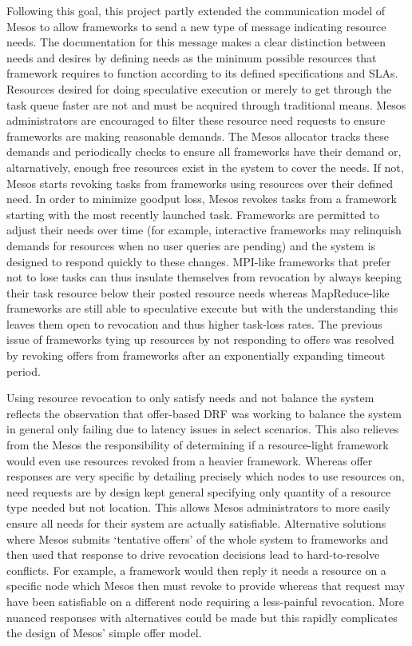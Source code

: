 Following this goal, this project partly extended the communication model of Mesos to allow frameworks to send a new type of message indicating resource needs. The documentation for this message makes a clear distinction between needs and desires by defining needs as the minimum possible resources that framework requires to function according to its defined specifications and SLAs. Resources desired for doing speculative execution or merely to get through the task queue faster are not and must be acquired through traditional means. Mesos administrators are encouraged to filter these resource need requests to ensure frameworks are making reasonable demands. The Mesos allocator tracks these demands and periodically checks to ensure all frameworks have their demand or, altarnatively, enough free resources exist in the system to cover the needs. If not, Mesos starts revoking tasks from frameworks using resources over their defined need. In order to minimize goodput loss, Mesos revokes tasks from a framework starting with the most recently launched task. Frameworks are permitted to adjust their needs over time (for example, interactive frameworks may relinquish demands for resources when no user queries are pending) and the system is designed to respond quickly to these changes. MPI-like frameworks that prefer not to lose tasks can thus insulate themselves from revocation by always keeping their task resource below their posted resource needs whereas MapReduce-like frameworks are still able to speculative execute but with the understanding this leaves them open to revocation and thus higher task-loss rates. The previous issue of frameworks tying up resources by not responding to offers was resolved by revoking offers from frameworks after an exponentially expanding timeout period.

Using resource revocation to only satisfy needs and not balance the system reflects the observation that offer-based DRF was working to balance the system in general only failing due to latency issues in select scenarios. This also relieves from the Mesos the responsibility of determining if a resource-light framework would even use resources revoked from a heavier framework. Whereas offer responses are very specific by detailing precisely which nodes to use resources on, need requests are by design kept general specifying only quantity of a resource type needed but not location. This allows Mesos administrators to more easily ensure all needs for their system are actually satisfiable. Alternative solutions where Mesos submits `tentative offers' of the whole system to frameworks and then used that response to drive revocation decisions lead to hard-to-resolve conflicts. For example, a framework would then reply it needs a resource on a specific node which Mesos then must revoke to provide whereas that request may have been satisfiable on a different node requiring a less-painful revocation. More nuanced responses with alternatives could be made but this rapidly complicates the design of Mesos' simple offer model.
